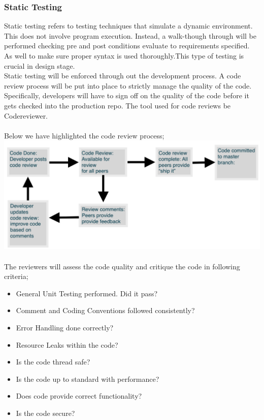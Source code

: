 \documentclass[12pt]{article}
\begin{document}
\subsubsection{Static Testing}
Static testing refers to testing techniques that simulate a dynamic environment. This does not involve program execution. Instead, a walk-though through will be performed checking pre and post conditions evaluate to requirements specified. As well to make sure proper syntax is used thoroughly.This type of testing is crucial in design stage. \\
Static testing will be enforced through out the development process. A code review process will be put into place to strictly manage the quality of the code. Specifically, developers will have to sign off on the quality of the code before it gets checked into the production repo. The tool used for code reviews be Codereviewer. \\\\
Below we have highlighted the code review process;\\
\includegraphics[width=\textwidth,height=\textheight,keepaspectratio]{review_process.png}\\\\
The reviewers will assess the code quality and critique the code in following criteria;\\
\begin{itemize}
 \item General Unit Testing performed. Did it pass?
 \item Comment and Coding Conventions followed consistently?
 \item Error Handling done correctly?
 \item Resource Leaks within the code?
 \item Is the code thread safe?
 \item Is the code up to standard with performance?
 \item Does code provide correct functionality?
 \item Is the code secure?
 \end{itemize}
\end{document}
